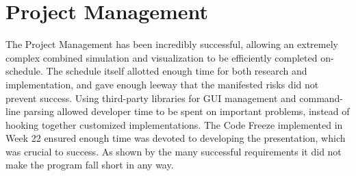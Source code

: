 \section{Project Management}
The Project Management has been incredibly successful, allowing an extremely complex combined simulation and visualization to be efficiently completed on-schedule.
The schedule itself allotted enough time for both research and implementation, and gave enough leeway that the manifested risks did not prevent success.
Using third-party libraries for GUI management and command-line parsing allowed developer time to be spent on important problems, instead of hooking together customized implementations.
The Code Freeze implemented in Week 22 ensured enough time was devoted to developing the presentation, which was crucial to success.
As shown by the many successful requirements it did not make the program fall short in any way.






